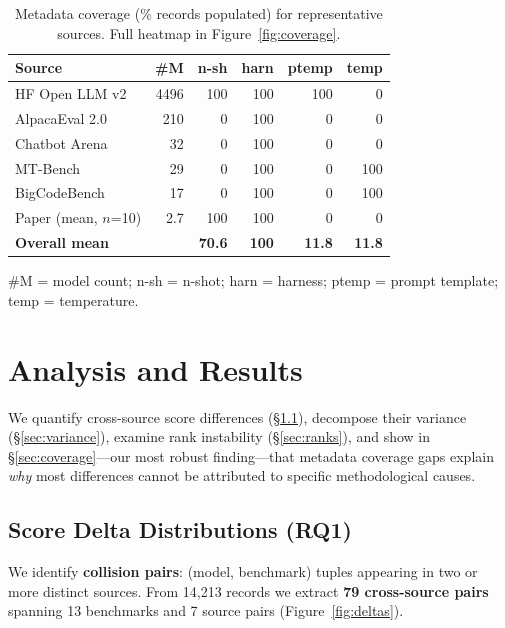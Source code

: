 \documentclass[11pt]{article}
\begin{document}
\begin{table}[t]
\centering
\small
\setlength{\tabcolsep}{3.5pt}
\caption{Metadata coverage (\% records populated) for representative
sources. Full heatmap in Figure~\ref{fig:coverage}.}
\label{tab:coverage}
\begin{tabular}{lrrrrr}
\toprule
\textbf{Source} & \textbf{\#M} & \textbf{n-sh} & \textbf{harn} & \textbf{ptemp} & \textbf{temp} \\
\midrule
HF Open LLM v2         & 4496 & 100 & 100 & 100 & 0 \\
AlpacaEval 2.0         &  210 &   0 & 100 &   0 & 0 \\
Chatbot Arena          &   32 &   0 & 100 &   0 & 0 \\
MT-Bench               &   29 &   0 & 100 &   0 & 100 \\
BigCodeBench           &   17 &   0 & 100 &   0 & 100 \\
Paper (mean, $n$=10)   &  2.7 & 100 & 100 &   0 & 0 \\
\midrule
\textbf{Overall mean}  &      & \textbf{70.6} & \textbf{100} & \textbf{11.8} & \textbf{11.8} \\
\bottomrule
\end{tabular}
\vspace{-2pt}
\footnotesize
\#M = model count; n-sh = n-shot; harn = harness; ptemp = prompt template; temp = temperature.
\end{table}

\section{Analysis and Results}

We quantify cross-source score differences (\S\ref{sec:deltas}),
decompose their variance (\S\ref{sec:variance}), examine rank instability
(\S\ref{sec:ranks}), and show in \S\ref{sec:coverage}---our most robust
finding---that metadata coverage gaps explain \emph{why} most differences
cannot be attributed to specific methodological causes.

\subsection{Score Delta Distributions (RQ1)}
\label{sec:deltas}

We identify \textbf{collision pairs}: (model, benchmark) tuples appearing
in two or more distinct sources.
From 14,213 records we extract \textbf{79 cross-source pairs} spanning
13 benchmarks and 7 source pairs (Figure~\ref{fig:deltas}).
\end{document}
